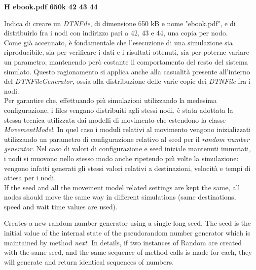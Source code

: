 \begin{center}
\textbf{H	ebook.pdf	650k	42	43	44}
\end{center}
Indica di creare un \textit{DTNFile}, di dimensione 650 kB e nome "ebook.pdf", e di distribuirlo fra i nodi con indirizzo pari a 42, 43 e 44, una copia per nodo.
\\

Come già  accennato, è fondamentale che l'esecuzione di una simulazione sia riproducibile, sia per verificare i dati e i risultati ottenuti, sia per poterne variare un parametro, mantenendo però costante il comportamento del resto del sistema simulato. Questo ragionamento si applica anche alla casualità  presente all'interno del \textit{DTNFileGenerator}, ossia alla distribuzione delle varie copie dei \textit{DTNFile} fra i nodi.
\\
Per garantire che, effettuando più simulazioni utilizzando la medesima configurazione, i files vengano distribuiti agli stessi nodi, è stata adottata la stessa tecnica utilizzata dai modelli di movimento che estendono la classe \textit{MovementModel}. In quel caso i moduli relativi al movimento vengono inizializzati utilizzando un parametro di configurazione relativo al seed per il \textit{random number generator}. Nel caso di valori di configurazione e seed iniziale mantenuti immutati, i nodi si muovono nello stesso modo anche ripetendo più volte la simulazione: vengono infatti generati gli stessi valori relativi a destinazioni, velocità  e tempi di attesa per i nodi.
\\
If the seed and all the movement model related settings are kept the same, all nodes should 
move the same way in different simulations (same destinations, speed and wait time values are used).

Creates a new random number generator using a single long seed. The seed is the initial value of the internal state of the pseudorandom number generator which is maintained by method \textit{next}. In details, if two instances of Random are created with the same seed, and the same sequence of method calls is made for each, they will generate and return identical sequences of numbers.



